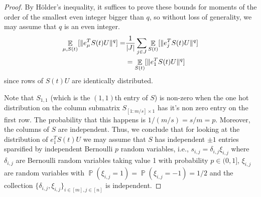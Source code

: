 \documentclass[11pt]{amsart}
\numberwithin{equation}{section}
\numberwithin{equation}{section}
\DeclareMathOperator{\E}{\mathbb{E}}
\DeclareMathOperator{\Pb}{\mathbb{P}}
\DeclarePairedDelimiter{\norm}{\lVert}{\rVert}
\DeclarePairedDelimiter{\abs}{\lvert}{\rvert}
\theoremstyle{remark}
\theoremstyle{definition}
\begin{document}
\begin{proof}
    By Hölder's inequality, it suffices to prove these bounds for moments of the order of the smallest even integer bigger than $q$, so without loss of generality, we may assume that $q$ is an even integer. 
    \begin{align*}
        \E_{\mu, S(t)} [ \norm{e_{\mu}^TS(t)U}^{q}] =& \frac{1}{\abs{J}}\sum_{j \in J} \E_{S(t)} [ \norm{e_{j}^TS(t)U}^{q}] \\
        & = \E_{S(t)} [ \norm{e_{1}^TS(t)U}^{q}]
    \end{align*}
    since rows of $S(t)U$ are identically distributed.

Note that $S_{1,1}$ (which is the $(1,1)$th entry of $S$) is non-zero when the one hot distribution on the column submatrix $S_{[1:m/s]\times{1}}$ has it's non zero entry on the first row. The probability that this happens is $1/(m/s) = s/m = p$. Moreover, the columns of $S$ are independent. Thus, we conclude that for looking at the distribution of $e_{1}^TS(t)U$ we may assume that $S$ has independent 
$\pm 1$ entries sparsified by independent Bernoulli $p$ random variables, i.e., $s_{i,j}=\delta_{i,j} \xi_{i,j}$ where $\delta_{i,j}$ are Bernoulli random variables taking value 1 with probability $p \in (0,1]$, $\xi_{i,j}$ are random variables with $\Pb(\xi_{i,j}=1)=\Pb(\xi_{i,j}=-1)=1/2$ and the collection $\{\delta_{i,j}, \xi_{i,j} \}_{i \in [m], j \in [n]}$ is independent.



\end{proof}
\end{document}
